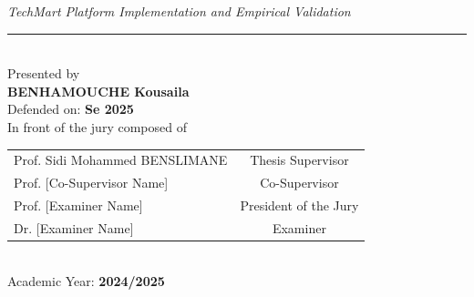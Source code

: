 \begin{center}
{\normalsize \textit{TechMart Platform Implementation and Empirical Validation}} \\[0.5cm]

\rule{14cm}{0.5pt} \\[0.7cm]

{\normalsize Presented by} \\[0.3cm]
{\large \textbf{BENHAMOUCHE Kousaila}} \\[0.6cm]

{\normalsize Defended on: \textbf{Se 2025}} \\[0.3cm]
{\normalsize In front of the jury composed of} \\[0.5cm]

{\normalsize
\begin{tabular}{lc}
Prof. Sidi Mohammed BENSLIMANE & Thesis Supervisor \\[0.3cm]
Prof. [Co-Supervisor Name] & Co-Supervisor \\[0.3cm]
Prof. [Examiner Name] & President of the Jury \\[0.3cm]
Dr. [Examiner Name] & Examiner \\
\end{tabular}} \\[0.8cm]

{\normalsize Academic Year: \textbf{2024/2025}}

\end{center}

\restoregeometry
\newpage